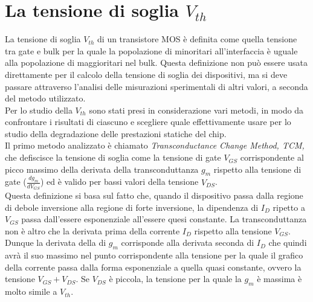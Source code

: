 \documentclass[12pt, letterpaper]{book}
\begin{document}
\chapter{La tensione di soglia $V_{th}$}

La tensione di soglia $V_{th}$ di un transistore MOS è definita come quella tensione tra gate e bulk per la quale la popolazione di minoritari all’interfaccia è uguale alla popolazione di maggioritari nel bulk. Questa definizione non può essere usata direttamente per il calcolo della tensione di soglia dei dispositivi, ma si deve passare attraverso l'analisi delle misurazioni sperimentali di altri valori, a seconda del metodo utilizzato. \\	
Per lo studio della $V_{th}$ sono stati presi in considerazione vari metodi, in modo da confrontare i risultati di ciascuno e scegliere quale effettivamente usare per lo studio della degradazione delle prestazioni statiche del chip.\\

Il primo metodo analizzato è chiamato \emph{Transconductance Change Method, TCM,} che defiscisce la tensione di soglia come la tensione di gate $V_{GS}$ corrispondente al picco massimo della derivata della transconduttanza $g_m$ rispetto alla tensione di gate ($\frac{dg_m}{dV_ {GS}}$) ed è valido per bassi valori della tensione $V_{DS}$.\\
Questa definizione si basa sul fatto che, quando il dispositivo passa dalla regione di debole inversione alla regione di forte inversione, la dipendenza di $I_D$ ripetto a $V_{GS}$ passa dall'essere esponenziale all'essere quesi constante. 
La transconduttanza non è altro che la derivata prima della corrente $I_D$ rispetto alla tensione $V_{GS}$. Dunque la derivata della di $g_m$ corrisponde alla derivata seconda di $I_D$ che quindi avrà il suo massimo nel punto corrispondente alla tensione per la quale il grafico della corrente passa dalla forma esponenziale a quella quasi constante, ovvero la tensione $V_{GS}+V_{DS}$. Se $V_{DS}$ è piccola, la tensione per la quale la $g_m$ è massima è molto simile a $V_{th}$.\\
\end{document}
